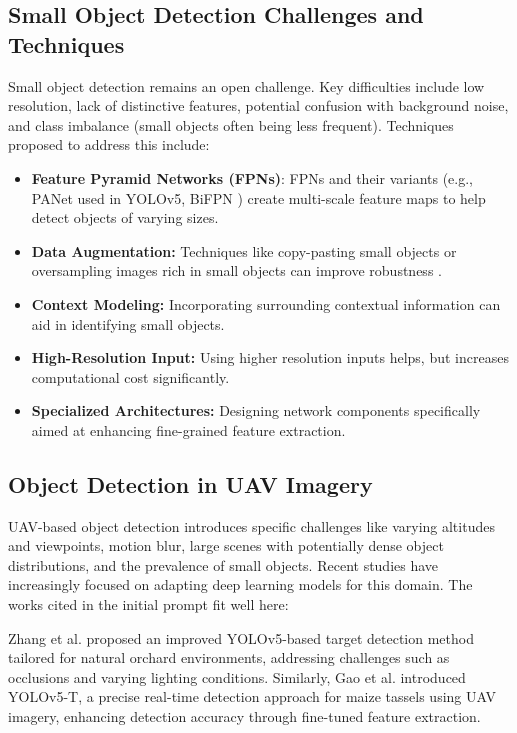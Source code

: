 \documentclass[conference]{IEEEtran}
\begin{document}
\subsection{Small Object Detection Challenges and Techniques}
Small object detection remains an open challenge. Key difficulties include low resolution, lack of distinctive features, potential confusion with background noise, and class imbalance (small objects often being less frequent). Techniques proposed to address this include:
\begin{itemize}
    \item \textbf{Feature Pyramid Networks (FPNs)}: \cite{lin2017feature} FPNs and their variants (e.g., PANet \cite{liu2018path} used in YOLOv5, BiFPN \cite{tan2020efficientdet}) create multi-scale feature maps to help detect objects of varying sizes.
    \item \textbf{Data Augmentation:} Techniques like copy-pasting small objects or oversampling images rich in small objects can improve robustness \cite{cubuk2019autoaugment}.
    \item \textbf{Context Modeling:} Incorporating surrounding contextual information can aid in identifying small objects.
    \item \textbf{High-Resolution Input:} Using higher resolution inputs helps, but increases computational cost significantly.
    \item \textbf{Specialized Architectures:} Designing network components specifically aimed at enhancing fine-grained feature extraction.
\end{itemize}

\subsection{Object Detection in UAV Imagery}
UAV-based object detection introduces specific challenges like varying altitudes and viewpoints, motion blur, large scenes with potentially dense object distributions, and the prevalence of small objects. Recent studies have increasingly focused on adapting deep learning models for this domain. The works cited in the initial prompt fit well here:

Zhang et al. \cite{Zhang2024AnIT} proposed an improved YOLOv5-based target detection method tailored for natural orchard environments, addressing challenges such as occlusions and varying lighting conditions. Similarly, Gao et al. \cite{Gao2024YOLOv5TAP} introduced YOLOv5-T, a precise real-time detection approach for maize tassels using UAV imagery, enhancing detection accuracy through fine-tuned feature extraction.
\end{document}
